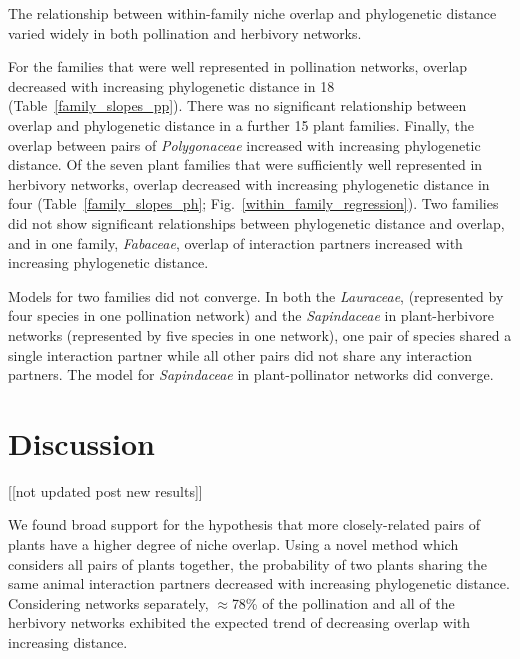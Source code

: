 \documentclass[12pt]{article}
\begin{document}
\begin{spacing}{1.5}
    The relationship between within-family niche overlap and phylogenetic distance
    varied widely in both pollination and herbivory networks. 

    For the families
    that were well represented in pollination networks, overlap decreased
    with increasing phylogenetic distance in 18 (Table~\ref{family_slopes_pp}).
    There was no significant relationship between overlap and phylogenetic distance in
    a further 15 plant families. Finally, the overlap between pairs of \emph{Polygonaceae}
    increased with increasing phylogenetic distance. 
    Of the seven plant families that were sufficiently well represented in herbivory 
    networks, overlap decreased with increasing phylogenetic distance in four 
    (Table~\ref{family_slopes_ph}; Fig.~\ref{within_family_regression}). Two
    families did not show significant relationships between phylogenetic distance and overlap,
    and in one family, \emph{Fabaceae}, overlap of interaction partners increased with 
    increasing phylogenetic distance.


    Models for two families did not converge. In both the \emph{Lauraceae}, (represented by four species in one pollination network) and the \emph{Sapindaceae} in plant-herbivore networks (represented by five species in one network), one pair of species shared a single interaction partner while all other pairs did not share any interaction partners. The model for \emph{Sapindaceae} in plant-pollinator networks did converge.


\section*{Discussion} [[not updated post new results]]

  We found broad support for the hypothesis that more
  closely-related pairs of plants have a higher degree
  of niche overlap. Using a novel method which considers
  all pairs of plants together, 
  the probability of two plants sharing the same animal 
  interaction partners decreased with increasing 
  phylogenetic distance. Considering networks separately,
  $\approx$78\%  of the pollination and all of the 
  herbivory networks exhibited the expected trend of decreasing 
  overlap with increasing distance. 



\end{spacing}
\end{document}
